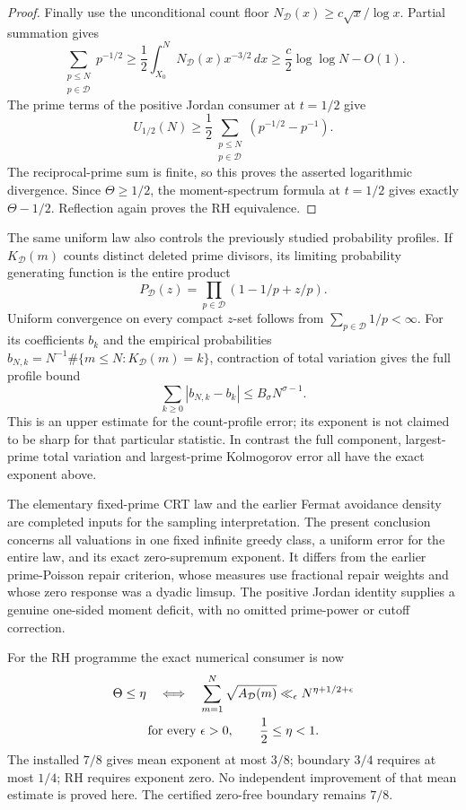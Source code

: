 \documentclass[11pt]{article}
\theoremstyle{definition}
\begin{document}
\begin{proof}
Finally use the unconditional count floor
$N_{\mathcal D}(x)\ge c\sqrt x/\log x$.
Partial summation gives
\[
 \sum_{\substack{p\le N\\p\in\mathcal D}}p^{-1/2}
 \ge \frac12\int_{X_0}^N
                    N_{\mathcal D}(x)x^{-3/2}\,dx
 \ge\frac c2\log\log N-O(1).
\]
The prime terms of the positive Jordan consumer at $t=1/2$ give
\[
 U_{1/2}(N)\ge
 \frac12\sum_{\substack{p\le N\\p\in\mathcal D}}
                 (p^{-1/2}-p^{-1}).
\]
The reciprocal-prime sum is finite, so this proves the asserted
logarithmic divergence.
Since $\Theta\ge1/2$, the moment-spectrum formula at $t=1/2$
gives exactly $\Theta-1/2$.
Reflection again proves the RH equivalence.
\end{proof}

The same uniform law also controls the previously studied probability
profiles. If $K_{\mathcal D}(m)$ counts distinct deleted prime divisors,
its limiting probability generating function is the entire product
\[
 P_{\mathcal D}(z)=
             \prod_{p\in\mathcal D}(1-1/p+z/p).
\]
Uniform convergence on every compact $z$-set follows from
$\sum_{p\in\mathcal D}1/p<\infty$.
For its coefficients $b_k$ and the empirical probabilities
$b_{N,k}=N^{-1}\#\{m\le N:K_{\mathcal D}(m)=k\}$, contraction of
total variation gives the full profile bound
\[
                  \sum_{k\ge0}|b_{N,k}-b_k|
                                  \le B_\sigma N^{\sigma-1}.
\]
This is an upper estimate for the count-profile error; its exponent
is not claimed to be sharp for that particular statistic.
In contrast the full component, largest-prime total variation and
largest-prime Kolmogorov error all have the exact exponent above.

The elementary fixed-prime CRT law and the earlier Fermat avoidance
density are completed inputs for the sampling interpretation.
The present conclusion concerns all valuations in one fixed infinite
greedy class, a uniform error for the entire law, and its exact
zero-supremum exponent. It differs from the earlier prime-Poisson
repair criterion, whose measures use fractional repair weights and
whose zero response was a dyadic limsup.
The positive Jordan identity supplies a genuine one-sided moment
deficit, with no omitted prime-power or cutoff correction.

For the RH programme the exact numerical consumer is now
\[
 \begin{gathered}
 \Theta\le\eta
 \quad\Longleftrightarrow\quad
 \sum_{m=1}^N\sqrt{A_{\mathcal D}(m)}
             \ll_\epsilon N^{\eta+1/2+\epsilon}\\
 \hbox{for every }\epsilon>0,\qquad \frac12\le\eta<1 .
 \end{gathered}
\]
The installed $7/8$ gives mean exponent at most $3/8$;
boundary $3/4$ requires at most $1/4$; RH requires exponent zero.
No independent improvement of that mean estimate is proved here.
The certified zero-free boundary remains $7/8$.
\end{document}

